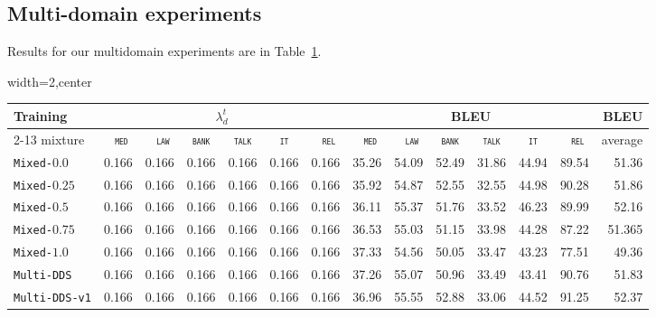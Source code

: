 \documentclass[11pt,a4paper]{article}
\newcommand{\domain}[1]{\texttt{\textsc{#1}}}
\newcommand{\system}[1]{\texttt{{#1}}}
\begin{document}
\subsection{Multi-domain experiments}
Results for our multidomain experiments are in Table~\ref{tab:multidomains}.

\begin{table}
  \centering%
  \begin{adjustbox}{width=2\columnwidth,center}
  \begin{tabular}{|p{3.0cm}|*{13}{r|}} \hline
    \multirow{2}{*}{Training} & \multicolumn{6}{|c}{$\lambda^t_d$} & \multicolumn{6}{|c|}{BLEU} & \multirow{2}{*}{BLEU} \\ \cline{2-13}	
  mixture & \multicolumn{1}{c|}{\domain{ med}} & \multicolumn{1}{c|}{\domain{ law}} & \multicolumn{1}{c|}{\domain{bank}} & \multicolumn{1}{c|}{\domain{talk}} & \multicolumn{1}{c|}{\domain{ it }} & \multicolumn{1}{c|}{\domain{ rel}} & \multicolumn{1}{c|}{\domain{ med}} & \multicolumn{1}{c|}{\domain{ law}} & \multicolumn{1}{c|}{\domain{bank}} & \multicolumn{1}{c|}{\domain{talk}} & \multicolumn{1}{c|}{\domain{ it }} & \multicolumn{1}{c|}{\domain{ rel}} & average \\
    \hline
  \system{Mixed-$0.0$} & 0.166&0.166 &0.166 &0.166 &0.166 & 0.166 & 35.26 &54.09 &52.49& 31.86& 44.94& 89.54& 51.36\\
  \system{Mixed-$0.25$} & 0.166&0.166 &0.166 &0.166 &0.166 & 0.166 &35.92& 54.87& 52.55& 32.55& 44.98& 90.28& 51.86\\
  \system{Mixed-$0.5$} & 0.166&0.166 &0.166 &0.166 &0.166 & 0.166 &36.11& 55.37& 51.76& 33.52& 46.23& 89.99& 52.16\\
  \system{Mixed-$0.75$} & 0.166&0.166 &0.166 &0.166 &0.166 & 0.166 &36.53&	55.03& 51.15& 33.98& 44.28& 87.22& 51.365\\
  \system{Mixed-$1.0$} & 0.166&0.166 &0.166 &0.166 &0.166 & 0.166 &37.33& 54.56& 50.05& 33.47& 43.23& 77.51& 49.36\\
  \system{Multi-DDS} & 0.166&0.166 &0.166 &0.166 &0.166 & 0.166 & 37.26 & 55.07&50.96&33.49&43.41&90.76& 51.83 \\
  \system{Multi-DDS-v1} & 0.166&0.166 &0.166 &0.166 &0.166 & 0.166 & 36.96 & 55.55 & 52.88 & 33.06 & 44.52 &91.25 & 52.37\\
  \hline
  \end{tabular}
\end{adjustbox}
  \label{tab:multidomains}
\end{table}
\end{document}

